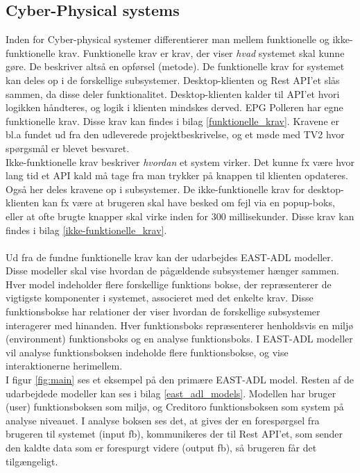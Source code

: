 \subsection{Cyber-Physical systems}

Inden for Cyber-physical systemer differentierer man mellem funktionelle og ikke-funktionelle krav. Funktionelle krav er krav, der viser \textit{hvad} systemet skal kunne gøre. De beskriver altså en opførsel (metode). De funktionelle krav for systemet kan deles op i de forskellige subsystemer. Desktop-klienten og Rest API'et slås sammen, da disse deler funktionalitet. Desktop-klienten kalder til API'et hvori logikken håndteres, og logik i klienten mindskes derved. EPG Polleren har egne funktionelle krav. Disse krav kan findes i bilag \ref{funktionelle_krav}. Kravene er bl.a fundet ud fra den udleverede projektbeskrivelse, og et møde med TV2 hvor spørgsmål er blevet besvaret. \\

Ikke-funktionelle krav beskriver \textit{hvordan} et system virker. Det kunne fx være hvor lang tid et API kald må tage fra man trykker på knappen til klienten opdateres. Også her deles kravene op i subsystemer. De ikke-funktionelle krav for desktop-klienten kan fx være at brugeren skal have besked om fejl via en popup-boks, eller at ofte brugte knapper skal virke inden for 300 millisekunder. Disse krav kan findes i bilag \ref{ikke-funktionelle_krav}. \\

\\
Ud fra de fundne funktionelle krav kan der udarbejdes EAST-ADL modeller. Disse modeller skal vise hvordan de pågældende subsystemer hænger sammen. Hver model indeholder flere forskellige funktions bokse, der repræsenterer de vigtigste komponenter i systemet, associeret med det enkelte krav. Disse funktionsbokse har relationer der viser hvordan de forskellige subsystemer interagerer med hinanden. Hver funktionsboks repræsenterer henholdsvis en miljø (environment) funktionsboks og en analyse funktionsboks. I EAST-ADL modeller vil analyse funktionsboksen indeholde flere funktionsbokse, og vise interaktionerne herimellem.\\

I figur \ref{fig:main} ses et eksempel på den primære EAST-ADL model. Resten af de udarbejdede modeller kan ses i bilag \ref{east_adl_models}. Modellen har bruger (user) funktionsboksen som miljø, og Creditoro funktionsboksen som system på analyse niveauet. I analyse boksen ses det, at gives der en forespørgsel fra brugeren til systemet (input fb), kommunikeres der til Rest API'et, som sender den kaldte data som er forespurgt videre (output fb), så brugeren får det tilgængeligt.


